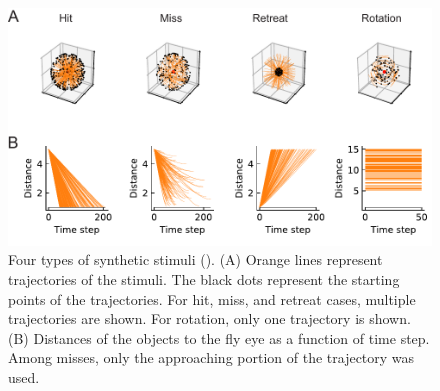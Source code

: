 \documentclass[pdftex,9pt,lineno]{elife}
\begin{document}
\begin{figure}
\includegraphics[width=\linewidth]{figures/stimuli_1_paper.pdf}
\caption{Four types of synthetic stimuli (). (A) Orange lines represent trajectories of the stimuli. The black dots represent the starting points of the trajectories. For hit, miss, and retreat cases, multiple trajectories are shown. For rotation, only one trajectory is shown. (B) Distances of the objects to the fly eye as a function of time step. Among misses, only the approaching portion of the trajectory was used.}
\label{fig:stimuliTraj}
\end{figure}
\end{document}
